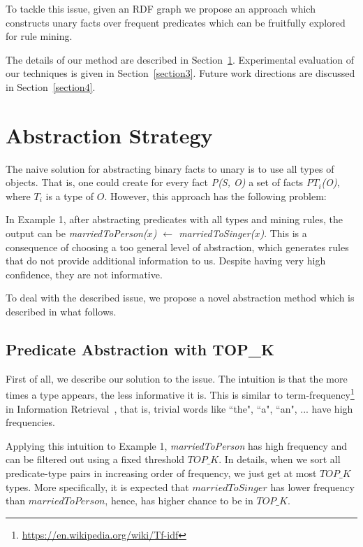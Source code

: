 \documentclass{acm_proc_article-sp}
\begin{document}
To tackle this issue, given an RDF graph we propose an approach which constructs unary facts over frequent predicates which can be fruitfully explored for rule mining.

The details of our method are described in Section~\ref{section2}. Experimental evaluation of our techniques is given in Section~\ref{section3}. Future work directions are discussed in Section~\ref{section4}.

\section{Abstraction Strategy}
\label{section2}

The naive solution for abstracting binary facts to unary is to use all types of objects. That is, one could create for every fact \textit{P(S, O)} a set of facts \textit{P$T_{i}$(O)}, where \textit{$T_{i}$} is a type of $O$. However, this approach has the following problem:

In Example 1, after abstracting predicates with all types and mining rules, the output can be \textit{marriedToPerson($x$) $\leftarrow$ marriedToSinger($x$)}. This is a consequence of choosing a too general level of abstraction, which generates rules that do not provide additional information to us. Despite having very high confidence, they are not informative.

To deal with the described issue, we propose a novel abstraction method which is described in what follows.

\subsection{Predicate Abstraction with TOP\_K}
\label{section21}

First of all, we describe our solution to the issue. The intuition is that the more times a type appears, the less informative it is. This is similar to term-frequency\footnote{\url{https://en.wikipedia.org/wiki/Tf-idf}} in Information Retrieval~\cite{ref2}, that is, trivial words like ``the", ``a", ``an", ... have high frequencies.

Applying this intuition to Example 1, \textit{marriedToPerson} has high frequency and can be filtered out using a fixed threshold $TOP\_K$. In details, when we sort all predicate-type pairs in increasing order of frequency, we just get at most $TOP\_K$ types. More specifically, it is expected that $marriedToSinger$ has lower frequency than $marriedToPerson$, hence, has higher chance to be in $TOP\_K$.
\end{document}
